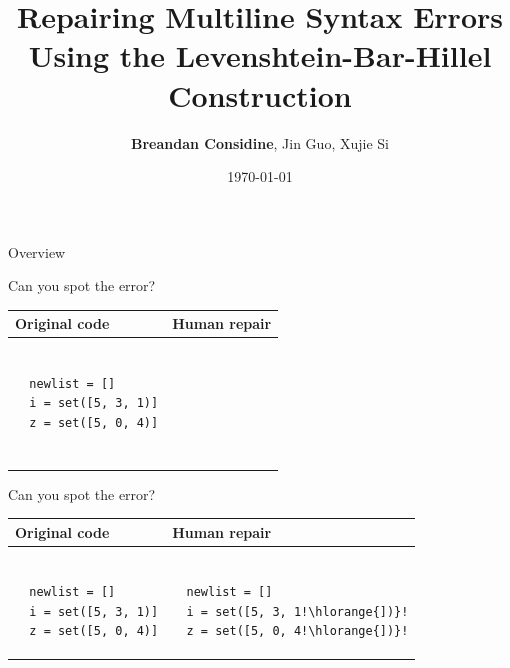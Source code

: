 \documentclass{beamer}
\title[Syntax Repair as Language Intersection]{Repairing Multiline Syntax Errors\\Using the Levenshtein-Bar-Hillel Construction}
\author[Considine, Guo, Si]{\textbf{Breandan Considine}, Jin Guo, Xujie Si}
\institute[McGill]{
  McGill University, Mila IQIA\\
  \medskip
  \textit{bre@ndan.co}
}
\date{\today}
\begin{document}
\begin{frame}
  \titlepage
\end{frame}

\begin{frame}{Overview}
  \tableofcontents
\end{frame}

\begin{frame}[fragile]{Can you spot the error?}
  \begin{center}
    \begin{tabular}{|m{5.5cm}|m{5.5cm}|}
      \hline \rule{0pt}{2.5ex}\textbf{Original code}\rule[-1ex]{0pt}{2ex} &  \rule{0pt}{2.5ex}\textbf{Human repair}\rule[-1ex]{0pt}{2ex} \\\hline
      \begin{lstlisting}[escapechar=!, basicstyle=\linespread{1.3}\ttfamily\footnotesize]

  newlist = []
  i = set([5, 3, 1)]
  z = set([5, 0, 4)]


      \end{lstlisting} & \begin{lstlisting}[escapechar=!, basicstyle=\linespread{1.3}\ttfamily\footnotesize]

      \end{lstlisting} \\\hline
    \end{tabular}
  \end{center}
\end{frame}

\begin{frame}[fragile]{Can you spot the error?}
  \begin{center}
    \begin{tabular}{|m{5.5cm}|m{5.5cm}|}
      \hline \rule{0pt}{2.5ex}\textbf{Original code}\rule[-1ex]{0pt}{2ex} &  \rule{0pt}{2.5ex}\textbf{Human repair}\rule[-1ex]{0pt}{2ex} \\\hline
      \begin{lstlisting}[escapechar=!, basicstyle=\linespread{1.3}\ttfamily\footnotesize]

  newlist = []
  i = set([5, 3, 1)]
  z = set([5, 0, 4)]

      \end{lstlisting} & \begin{lstlisting}[escapechar=!, basicstyle=\linespread{1.3}\ttfamily\footnotesize]

  newlist = []
  i = set([5, 3, 1!\hlorange{])}!
  z = set([5, 0, 4!\hlorange{])}!

      \end{lstlisting} \\\hline
    \end{tabular}
  \end{center}
\end{frame}
\end{document}
